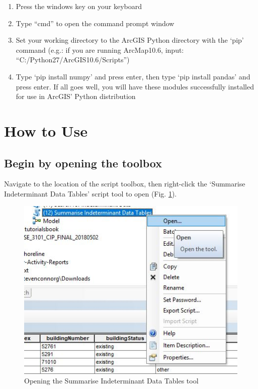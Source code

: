 \documentclass[openany]{book}
\providecommand{\tightlist}{%
  \setlength{\itemsep}{0pt}\setlength{\parskip}{0pt}}
\theoremstyle{definition}
\theoremstyle{definition}
\theoremstyle{definition}
\theoremstyle{remark}
\begin{document}
\begin{enumerate}
\def\labelenumi{\arabic{enumi}.}
\tightlist
\item
  Press the windows key on your keyboard
\item
  Type ``cmd'' to open the command prompt window
\item
  Set your working directory to the ArcGIS Python directory with the
  `pip' command (e.g.: if you are running ArcMap10.6, input:
  ``C:/Python27/ArcGIS10.6/Scripts'')
\item
  Type `pip install numpy' and press enter, then type `pip install
  pandas' and press enter. If all goes well, you will have these modules
  successfully installed for use in ArcGIS' Python distribution
\end{enumerate}

\section{How to Use}\label{how-to-use-9}

\subsection{Begin by opening the
toolbox}\label{begin-by-opening-the-toolbox-9}

Navigate to the location of the script toolbox, then right-click the
`Summarise Indeterminant Data Tables' script tool to open (Fig.
\ref{fig:summIndtopen}).

\begin{figure}[H]

{\centering \includegraphics{figures/summIndt-open} 

}

\caption{Opening the Summarise Indeterminant Data Tables tool}\label{fig:summIndtopen}
\end{figure}
\end{document}
